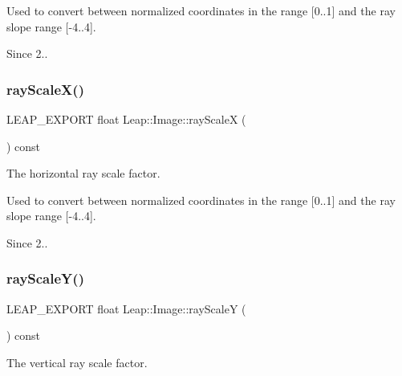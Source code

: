 Used to convert between normalized coordinates in the range \mbox{[}0..1\mbox{]} and the ray slope range \mbox{[}-\/4..4\mbox{]}.


\begin{DoxyCodeInclude}
\end{DoxyCodeInclude}


\begin{DoxySince}{Since}
2.. 
\end{DoxySince}
\mbox{\label{class_leap_1_1_image_a250f1d16a456cc7887bb8a2ca3958bb0}} 
\subsubsection{\texorpdfstring{ray\+Scale\+X()}{rayScaleX()}}
{\footnotesize\ttfamily L\+E\+A\+P\+\_\+\+E\+X\+P\+O\+RT float Leap\+::\+Image\+::ray\+ScaleX (\begin{DoxyParamCaption}{ }\end{DoxyParamCaption}) const}

The horizontal ray scale factor.

Used to convert between normalized coordinates in the range \mbox{[}0..1\mbox{]} and the ray slope range \mbox{[}-\/4..4\mbox{]}.


\begin{DoxyCodeInclude}
\end{DoxyCodeInclude}


\begin{DoxySince}{Since}
2.. 
\end{DoxySince}
\mbox{\label{class_leap_1_1_image_a2a234dbcb6818b0d7cf1527682c1fdf6}} 
\subsubsection{\texorpdfstring{ray\+Scale\+Y()}{rayScaleY()}}
{\footnotesize\ttfamily L\+E\+A\+P\+\_\+\+E\+X\+P\+O\+RT float Leap\+::\+Image\+::ray\+ScaleY (\begin{DoxyParamCaption}{ }\end{DoxyParamCaption}) const}

The vertical ray scale factor.

